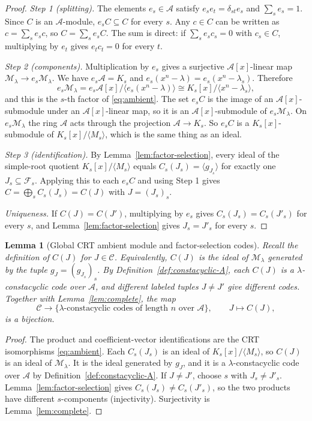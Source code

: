 \documentclass[10pt,a4paper]{article}
\newcommand{\A}{\mathcal A}
\newcommand{\Fs}{\mathcal F_s}
\numberwithin{equation}{section}
\theoremstyle{plain}
\newtheorem{lemma}[theorem]{Lemma}
\theoremstyle{definition}
\theoremstyle{remark}
\begin{document}
\begin{proof}
\emph{Step 1 (splitting).} The elements $e_s\in\A$ satisfy $e_se_t=\delta_{st}e_s$
and $\sum_s e_s=1$. Since $C$ is an $\A$-module, $e_sC\subseteq C$ for every $s$.
Any $c\in C$ can be written as $c=\sum_s e_sc$, so $C=\sum_s e_sC$. The sum is
direct: if $\sum_s e_sc_s=0$ with $c_s\in C$, multiplying by $e_t$ gives
$e_tc_t=0$ for every $t$.

\emph{Step 2 (components).} Multiplication by $e_s$ gives a surjective
$\A[x]$-linear map $\mathcal M_\lambda\to e_s\mathcal M_\lambda$. We have
$e_s\A=K_s$ and $e_s(x^{n}-\lambda)=e_s(x^{n}-\lambda_s)$. Therefore
\[
e_s\mathcal M_\lambda= e_s\A[x]\big/\langle e_s(x^{n}-\lambda)\rangle
 \cong K_s[x]/\langle x^{n}-\lambda_s\rangle,
\]
and this is the $s$-th factor of \eqref{eq:ambient}. The set $e_sC$ is the image
of an $\A[x]$-submodule under an $\A[x]$-linear map, so it is an
$\A[x]$-submodule of $e_s\mathcal M_\lambda$. On $e_s\mathcal M_\lambda$ the ring
$\A$ acts through the projection $\A\to K_s$. So $e_sC$ is a $K_s[x]$-submodule
of $K_s[x]/\langle M_s\rangle$, which is the same thing as an ideal.

\emph{Step 3 (identification).} By Lemma~\ref{lem:factor-selection}, every ideal
of the simple-root quotient $K_s[x]/\langle M_s\rangle$ equals
$C_s(J_s)=\langle g_{J_s}\rangle$ for exactly one $J_s\subseteq\Fs$. Applying
this to each $e_sC$ and using Step 1 gives $C=\bigoplus_s C_s(J_s)=C(J)$ with
$J=(J_s)_s$.

\emph{Uniqueness.} If $C(J)=C(J')$, multiplying by $e_s$ gives
$C_s(J_s)=C_s(J'_s)$ for every $s$, and Lemma~\ref{lem:factor-selection} gives
$J_s=J'_s$ for every $s$.
\end{proof}

\begin{lemma}[Global CRT ambient module and factor-selection codes]\label{lem:global-code}
Recall the definition of $C(J)$ for $J\in\mathscr C$. Equivalently, $C(J)$ is the
ideal of $\mathcal M_\lambda$ generated by the tuple $g_J=(g_{J_s})_s$. By
Definition~\ref{def:constacyclic-A}, each $C(J)$ is a $\lambda$-constacyclic code
over $\A$, and different labeled tuples $J\neq J'$ give different codes.
Together with Lemma~\ref{lem:complete}, the map
\[
\mathscr C\longrightarrow\{\lambda\text{-constacyclic codes of length }n\text{ over }\A\},
\qquad J\longmapsto C(J),
\]
is a bijection.
\end{lemma}

\begin{proof}
The product and coefficient-vector identifications are the CRT isomorphisms
\eqref{eq:ambient}. Each $C_s(J_s)$ is an ideal of $K_s[x]/\langle M_s\rangle$, so
$C(J)$ is an ideal of $\mathcal M_\lambda$. It is the ideal generated by $g_J$, and
it is a $\lambda$-constacyclic code over $\A$ by
Definition~\ref{def:constacyclic-A}. If $J\neq J'$, choose $s$ with
$J_s\neq J'_s$. Lemma~\ref{lem:factor-selection} gives
$C_s(J_s)\neq C_s(J'_s)$, so the two products have different $s$-components
(injectivity). Surjectivity is Lemma~\ref{lem:complete}.
\end{proof}
\end{document}
